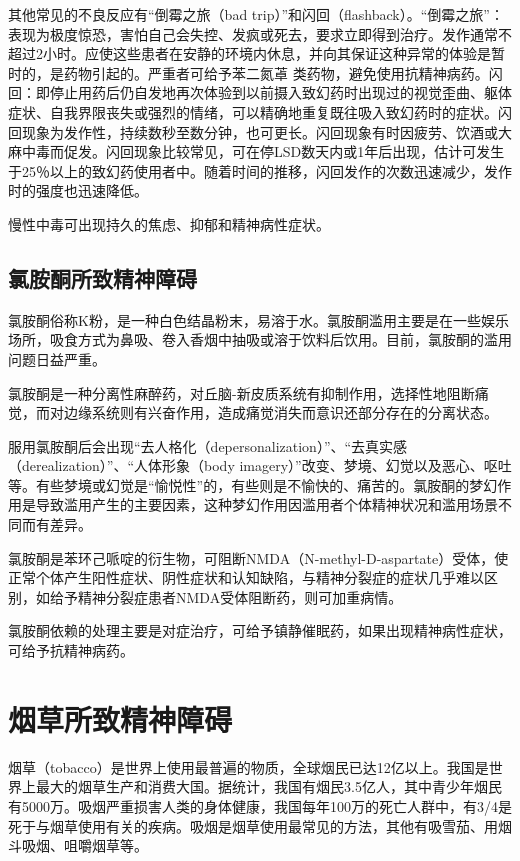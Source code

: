 其他常见的不良反应有``倒霉之旅（bad
trip）''和闪回（flashback）。``倒霉之旅''：表现为极度惊恐，害怕自己会失控、发疯或死去，要求立即得到治疗。发作通常不超过2小时。应使这些患者在安静的环境内休息，并向其保证这种异常的体验是暂时的，是药物引起的。严重者可给予苯二氮䓬
类药物，避免使用抗精神病药。闪回：即停止用药后仍自发地再次体验到以前摄入致幻药时出现过的视觉歪曲、躯体症状、自我界限丧失或强烈的情绪，可以精确地重复既往吸入致幻药时的症状。闪回现象为发作性，持续数秒至数分钟，也可更长。闪回现象有时因疲劳、饮酒或大麻中毒而促发。闪回现象比较常见，可在停LSD数天内或1年后出现，估计可发生于25％以上的致幻药使用者中。随着时间的推移，闪回发作的次数迅速减少，发作时的强度也迅速降低。

慢性中毒可出现持久的焦虑、抑郁和精神病性症状。

\subsection{氯胺酮所致精神障碍}

氯胺酮俗称K粉，是一种白色结晶粉末，易溶于水。氯胺酮滥用主要是在一些娱乐场所，吸食方式为鼻吸、卷入香烟中抽吸或溶于饮料后饮用。目前，氯胺酮的滥用问题日益严重。

氯胺酮是一种分离性麻醉药，对丘脑-新皮质系统有抑制作用，选择性地阻断痛觉，而对边缘系统则有兴奋作用，造成痛觉消失而意识还部分存在的分离状态。

服用氯胺酮后会出现``去人格化（depersonalization）''、``去真实感（derealization）''、``人体形象（body
imagery）''改变、梦境、幻觉以及恶心、呕吐等。有些梦境或幻觉是``愉悦性''的，有些则是不愉快的、痛苦的。氯胺酮的梦幻作用是导致滥用产生的主要因素，这种梦幻作用因滥用者个体精神状况和滥用场景不同而有差异。

氯胺酮是苯环己哌啶的衍生物，可阻断NMDA（N-methyl-D-aspartate）受体，使正常个体产生阳性症状、阴性症状和认知缺陷，与精神分裂症的症状几乎难以区别，如给予精神分裂症患者NMDA受体阻断药，则可加重病情。

氯胺酮依赖的处理主要是对症治疗，可给予镇静催眠药，如果出现精神病性症状，可给予抗精神病药。

\section{烟草所致精神障碍}

烟草（tobacco）是世界上使用最普遍的物质，全球烟民已达12亿以上。我国是世界上最大的烟草生产和消费大国。据统计，我国有烟民3.5亿人，其中青少年烟民有5000万。吸烟严重损害人类的身体健康，我国每年100万的死亡人群中，有3/4是死于与烟草使用有关的疾病。吸烟是烟草使用最常见的方法，其他有吸雪茄、用烟斗吸烟、咀嚼烟草等。

